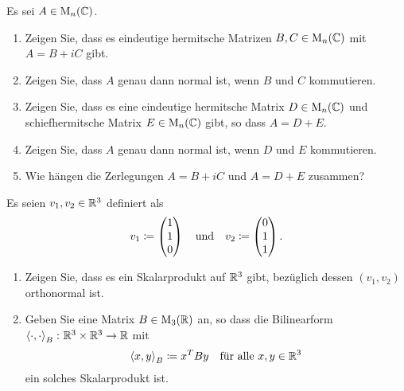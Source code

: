 \begin{question}[subtitle = Zerlegungen und Normalität komplexer Matrizen]{3}
  Es sei $A \in \operatorname{M}_n(\mathbb{C})$.
  \begin{enumerate}[leftmargin=*]
    \item
      Zeigen Sie, dass es eindeutige hermitsche Matrizen $B, C \in \operatorname{M}_n(\mathbb{C})$ mit $A = B + i C$ gibt.
    \item
      Zeigen Sie, dass $A$ genau dann normal ist, wenn $B$ und $C$ kommutieren.
    \item
      Zeigen Sie, dass es eine eindeutige hermitsche Matrix $D \in \operatorname{M}_n(\mathbb{C})$ und schiefhermitsche Matrix $E \in \operatorname{M}_n(\mathbb{C})$ gibt, so dass $A = D + E$.
    \item
      Zeigen Sie, dass $A$ genau dann normal ist, wenn $D$ und $E$ kommutieren.
    \item
      Wie hängen die Zerlegungen $A = B + i C$ und $A = D + E$ zusammen?
  \end{enumerate}
\end{question}


\begin{question}[subtitle = Ein Skalarprodukt konstruieren]{3}
  Es seien $v_1, v_2 \in \mathbb{R}^3$ definiert als
  \[
    v_1 \coloneqq \begin{pmatrix} 1 \\ 1 \\ 0 \end{pmatrix}
    \quad\text{und}\quad
    v_2 \coloneqq \begin{pmatrix} 0 \\ 1 \\ 1 \end{pmatrix}.
  \]
  \begin{enumerate}[leftmargin=*]
    \item
      Zeigen Sie, dass es ein Skalarprodukt auf $\mathbb{R}^3$ gibt, bezüglich dessen $(v_1, v_2)$ orthonormal ist.
    \item
      Geben Sie eine Matrix $B \in \operatorname{M}_3(\mathbb{R})$ an, so dass die Bilinearform $\left\langle \cdot, \cdot \right\rangle_B \colon \mathbb{R}^3 \times \mathbb{R}^3 \to \mathbb{R}$ mit
      \[
        \left\langle x, y \right\rangle_B \coloneqq x^T B y
        \quad
        \text{für alle $x, y \in \mathbb{R}^3$}
      \]
      ein solches Skalarprodukt ist.
  \end{enumerate}
\end{question}



